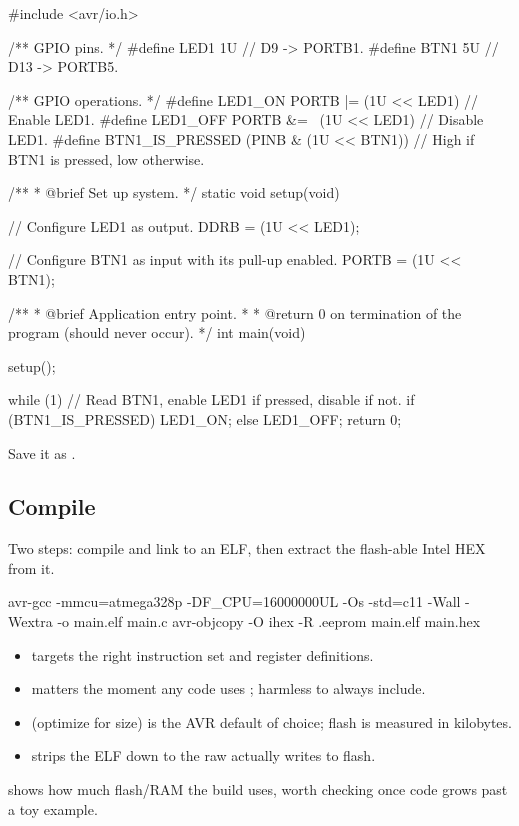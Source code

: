\begin{ccode}
#include <avr/io.h>

/** GPIO pins. */
#define LED1 1U // D9  -> PORTB1.
#define BTN1 5U // D13 -> PORTB5.

/** GPIO operations. */
#define LED1_ON PORTB |= (1U << LED1)         // Enable LED1.
#define LED1_OFF PORTB &= ~(1U << LED1)       // Disable LED1.
#define BTN1_IS_PRESSED (PINB & (1U << BTN1)) // High if BTN1 is pressed, low otherwise.

/**
 * @brief Set up system.
 */
static void setup(void)
{
    // Configure LED1 as output.
    DDRB = (1U << LED1);

    // Configure BTN1 as input with its pull-up enabled.
    PORTB = (1U << BTN1);
}

/**
 * @brief Application entry point.
 *
 * @return 0 on termination of the program (should never occur).
 */
int main(void)
{
    setup();

    while (1)
    {
        // Read BTN1, enable LED1 if pressed, disable if not.
        if (BTN1_IS_PRESSED) { LED1_ON; }
        else { LED1_OFF; }
    }
    return 0;
}
\end{ccode}

\noindent Save it as .

\subsection{Compile}
\label{c2:d:4}
Two steps: compile and link to an ELF, then extract the flash-able Intel HEX from it.

\begin{shell}
avr-gcc -mmcu=atmega328p -DF_CPU=16000000UL -Os -std=c11 -Wall -Wextra -o main.elf main.c
avr-objcopy -O ihex -R .eeprom main.elf main.hex
\end{shell}

\begin{itemize}
  \item {} targets the right instruction set and register definitions.
  \item {} matters the moment any code uses ; harmless
    to always include.
  \item {} (optimize for size) is the AVR default of choice; flash is measured in kilobytes.
  \item {} strips the ELF down to the raw   actually writes
    to flash.
\end{itemize}
 shows how much flash/RAM the build uses, worth checking once code grows
past a toy example.


